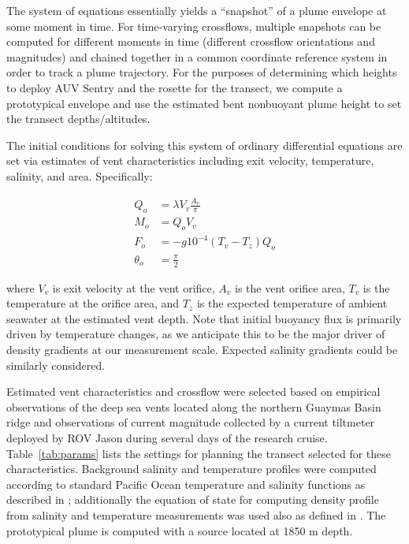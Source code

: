 The system of equations essentially yields a ``snapshot'' of a plume envelope at some moment in time. For time-varying crossflows, multiple snapshots can be computed for different moments in time (different crossflow orientations and magnitudes) and chained together in a common coordinate reference system in order to track a plume trajectory. For the purposes of determining which heights to deploy AUV Sentry and the rosette for the transect, we compute a prototypical envelope and use the estimated bent nonbuoyant plume height to set the transect depths/altitudes.

The initial conditions for solving this system of ordinary differential equations are set via estimates of vent characteristics including exit velocity, temperature, salinity, and area. Specifically:

\begin{align}
    Q_o &= \lambda V_v \frac{A_v}{\pi} \\
    M_o &= Q_o V_v \\
    F_o &= -g10^{-4}(T_v - T_z)Q_o \\
    \theta_o &= \frac{\pi}{2}
\end{align}

\noindent where $V_v$ is exit velocity at the vent orifice, $A_v$ is the vent orifice area, $T_v$ is the temperature at the orifice area, and $T_z$ is the expected temperature of ambient seawater at the estimated vent depth. Note that initial buoyancy flux is primarily driven by temperature changes, as we anticipate this to be the major driver of density gradients at our measurement scale. Expected salinity gradients could be similarly considered.

Estimated vent characteristics and crossflow were selected based on empirical observations of the deep sea vents located along the northern Guaymas Basin ridge and observations of current magnitude collected by a current tiltmeter deployed by ROV Jason during several days of the research cruise. Table~\ref{tab:params} lists the settings for planning the transect selected for these characteristics. Background salinity and temperature profiles were computed according to standard Pacific Ocean temperature and salinity functions as described in \cite{speer1989model}; additionally the equation of state for computing density profile from salinity and temperature measurements was used also as defined in \cite{speer1989model}. The prototypical plume is computed with a source located at 1850 m depth.

